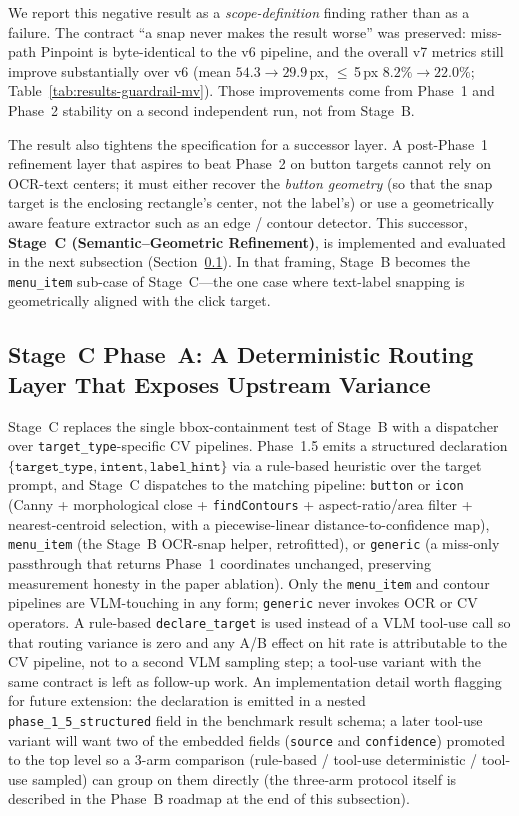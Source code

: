 We report this negative result as a \emph{scope-definition}
finding rather than as a failure.  The contract ``a snap never
makes the result worse'' was preserved: miss-path Pinpoint is
byte-identical to the v6 pipeline, and the overall v7 metrics
still improve substantially over v6 (mean $54.3 \to 29.9$\,px,
$\leq$\,5\,px $8.2\% \to 22.0\%$; Table~\ref{tab:results-guardrail-mv}).
Those improvements come from Phase~1 and Phase~2 stability on a
second independent run, not from Stage~B.

The result also tightens the specification for a successor layer.
A post-Phase~1 refinement layer that aspires to beat Phase~2 on
button targets cannot rely on OCR-text centers; it must either
recover the \emph{button geometry} (so that the snap target is the
enclosing rectangle's center, not the label's) or use a
geometrically aware feature extractor such as an edge / contour
detector.  This successor, \textbf{Stage~C (Semantic--Geometric
Refinement)}, is implemented and evaluated in the next subsection
(Section~\ref{sec:discussion-stage-c}).  In that framing, Stage~B
becomes the \texttt{menu\_item} sub-case of Stage~C---the one case
where text-label snapping is geometrically aligned with the click
target.

\subsection{Stage~C Phase~A: A Deterministic Routing Layer That
  Exposes Upstream Variance}
\label{sec:discussion-stage-c}

Stage~C replaces the single bbox-containment test of Stage~B with a
dispatcher over \texttt{target\_type}-specific CV pipelines.
Phase~1.5 emits a structured declaration
$\{\texttt{target\_type}, \texttt{intent}, \texttt{label\_hint}\}$
via a rule-based heuristic over the target prompt, and Stage~C
dispatches to the matching pipeline: \texttt{button} or \texttt{icon}
(Canny + morphological close +
\texttt{findContours} + aspect-ratio/area filter + nearest-centroid
selection, with a piecewise-linear distance-to-confidence map),
\texttt{menu\_item} (the Stage~B OCR-snap helper, retrofitted), or
\texttt{generic} (a miss-only passthrough that returns Phase~1
coordinates unchanged, preserving measurement honesty in the paper
ablation).  Only the \texttt{menu\_item} and contour pipelines are
VLM-touching in any form; \texttt{generic} never invokes OCR or CV
operators.  A rule-based \texttt{declare\_target} is used instead
of a VLM tool-use call so that routing variance is zero and any A/B
effect on hit rate is attributable to the CV pipeline, not to a
second VLM sampling step; a tool-use variant with the same contract
is left as follow-up work.  An implementation detail worth flagging
for future extension: the declaration is emitted in a nested
\texttt{phase\_1\_5\_structured} field in the benchmark result
schema; a later tool-use variant will want two of the embedded
fields (\texttt{source} and \texttt{confidence}) promoted to the
top level so a 3-arm comparison (rule-based / tool-use
deterministic / tool-use sampled) can group on them directly (the
three-arm protocol itself is described in the Phase~B roadmap at
the end of this subsection).

